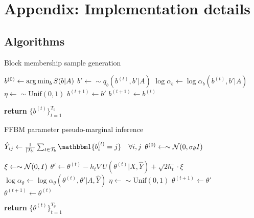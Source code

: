 \section{Appendix: Implementation details}

\subsection{Algorithms}
\label{appdx:algorithms}

\begin{algorithm} %
	\caption{Block membership sample generation} %
	\label{alg:b-samples} %
	\begin{algorithmic} %
		\State $b^{(0)} \gets \operatorname*{arg\,min}_b S(b|A)$ 
		\State $b' \gets \sim q_b(b^{(t)}, b' | A)$
		\State $\log \alpha_b \gets \log \alpha_b(b^{(t)}, b' | A)$
		\State $\eta \gets \sim \textrm{Unif}(0,1)$
		\State $b^{(t+1)} \gets b'$
		\Else
		\State $b^{(t+1)} \gets b^{(t)}$
		\EndIf
		\EndFor
		
		\State \textbf{return} $\{b^{(t)}\}_{t=1}^{T_b}$
		
	\end{algorithmic}
\end{algorithm}

\begin{algorithm} %
	\caption{FFBM parameter pseudo-marginal inference} %
	\label{alg:theta-samples} %
	\begin{algorithmic} %
		
		\State $\hat{Y}_{ij} \gets \frac{1}{|\Tcal_b|} \sum_{t \in \Tcal_b} \one \{ b^{(t)}_i = j\} \quad \forall i,j$
		\State $\theta^{(0)} \gets \sim \mathcal{N}(0, \sigma_\theta I)$
		
		\item[]
		
		\State $\xi \gets \sim \mathcal{N}(0, I)$
		\State $\theta' \gets \theta^{(t)} - h_t \nabla U(\theta^{(t)} | X, \hat{Y}) + \sqrt{2h_t} \cdot \xi$
		\State $\log \alpha_\theta \gets \log \alpha_\theta(\theta^{(t)}, \theta' | A, \hat{Y})$
		\State $\eta \gets \sim \textrm{Unif}(0,1)$
		\If{$\log \eta < \log \alpha_\theta$}
		\State $\theta^{(t+1)} \gets \theta'$
		\Else
		\State $\theta^{(t+1)} \gets \theta^{(t)}$
		\EndIf
		\EndFor
		
		\State \textbf{return} $\{\theta^{(t)}\}_{t=1}^{T_\theta}$
		
	\end{algorithmic}
\end{algorithm}

